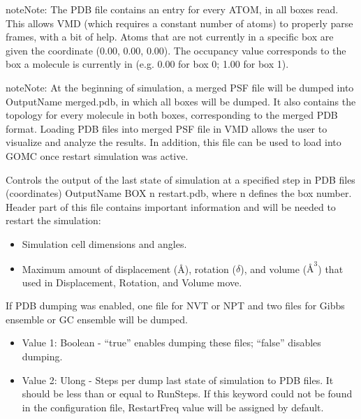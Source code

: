 \documentclass[letterpaper,10pt,english]{sphinxmanual}
\begin{document}
\begin{description}
\begin{itemize}
\end{itemize}

\begin{sphinxadmonition}{note}{Note:}
The PDB file contains an entry for every ATOM, in all boxes read. This allows VMD (which requires a constant number of atoms) to properly parse frames, with a bit of help. Atoms that are not currently in a specific box are given the coordinate (0.00, 0.00, 0.00). The occupancy value corresponds to the box a molecule is currently in (e.g. 0.00 for box 0; 1.00 for box 1).
\end{sphinxadmonition}

\begin{sphinxadmonition}{note}{Note:}
At the beginning of simulation, a merged PSF file will be dumped into OutputName merged.pdb, in which all boxes will be dumped. It also contains the topology for every molecule in both boxes, corresponding to the merged PDB format. Loading PDB files into merged PSF file in VMD allows the user to visualize and analyze the results. In addition, this file can be used to load into GOMC once restart simulation was active.
\end{sphinxadmonition}

\item[{\sphinxcode{\sphinxupquote{RestartFreq}}}] \leavevmode
Controls the output of the last state of simulation at a specified step in PDB files (coordinates) OutputName BOX n restart.pdb, where n defines the box number. Header part of this file contains important information and will be needed to restart the simulation:
\begin{itemize}
\item {} 
Simulation cell dimensions and angles.

\item {} 
Maximum amount of displacement (Å), rotation (\(\delta\)), and volume (\(Å^3\)) that used in Displacement, Rotation, and Volume move.

\end{itemize}

If PDB dumping was enabled, one file for NVT or NPT and two files for Gibbs ensemble or GC ensemble will be dumped.
\begin{itemize}
\item {} 
Value 1: Boolean - “true” enables dumping these files; “false” disables dumping.

\item {} 
Value 2: Ulong - Steps per dump last state of simulation to PDB files. It should be less than or equal to RunSteps. If this keyword could not be found in the configuration file, RestartFreq value will be assigned by default.


\end{itemize}
\end{description}
\end{document}
